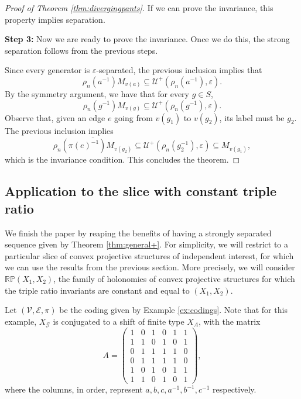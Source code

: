 \documentclass{amsart}
\theoremstyle{remark}
\theoremstyle{definition}
\begin{document}
\begin{proof}[Proof of Theorem \ref{thm:divergingpants}]
 If we can prove the invariance, this property implies separation.
 
\textbf{Step 3:} Now we are ready to prove the invariance.
Once we do this, the strong separation follows from the previous steps.

Since every generator is $\varepsilon$-separated, the previous inclusion implies that
$$\rho_n(a^{-1})M_{v(a)} \subseteq \mathcal{U}^+(\rho_n(a^{-1}), \varepsilon).$$
By the symmetry argument, we have that for every $g \in S$,
$$\rho_n(g^{-1})M_{v(g)} \subseteq \mathcal{U}^+(\rho_n(g^{-1}), \varepsilon).$$
Observe that, given an edge $e$ going from $v(g_1)$ to $v(g_2)$, its label must be $g_2$. 
The previous inclusion implies
$$\overline{\rho_n(\pi(e)^{-1})M_{v(g_2)}} \subseteq \mathcal{U}^+(\rho_n(g_2^{-1}), \varepsilon) \subseteq M_{v(g_1)},$$
which is the invariance condition. This concludes the theorem.
\end{proof}


\subsection{Application to the slice with constant triple ratio}

We finish the paper by reaping the benefits of having a strongly separated sequence given by Theorem \ref{thm:general+}.
For simplicity, we will restrict to a particular slice of convex projective structures of independent interest, for which we can use the results from the previous section.
More precisely, we will consider $\mathbb{RP} (X_1, X_2)$, the family of holonomies of convex projective structures for which the triple ratio invariants are constant and equal to $(X_1, X_2)$.

Let $(\mathcal{V}, \mathcal{E}, \pi)$ be the coding given by Example \ref{ex:codings}. Note that for this example, $X_\mathcal{G}$ is conjugated to a shift of finite type $X_A$, with the matrix 
      $$
 A =
        \begin{pmatrix}
            1 & 0 & 1 & 0 & 1 & 1 \\
            1 & 1 & 0 & 1 & 0 & 1 \\
            0 & 1 & 1 & 1 & 1 & 0 \\
            0 & 1 & 1 & 1 & 1 & 0 \\
            1 & 0 & 1 & 0 & 1 & 1 \\
            1 & 1 & 0 & 1 & 0 & 1
        \end{pmatrix},
      $$
 where the columns, in order, represent $a, b, c, a^{-1}, b^{-1}, c^{-1}$ respectively. 
\end{document}
